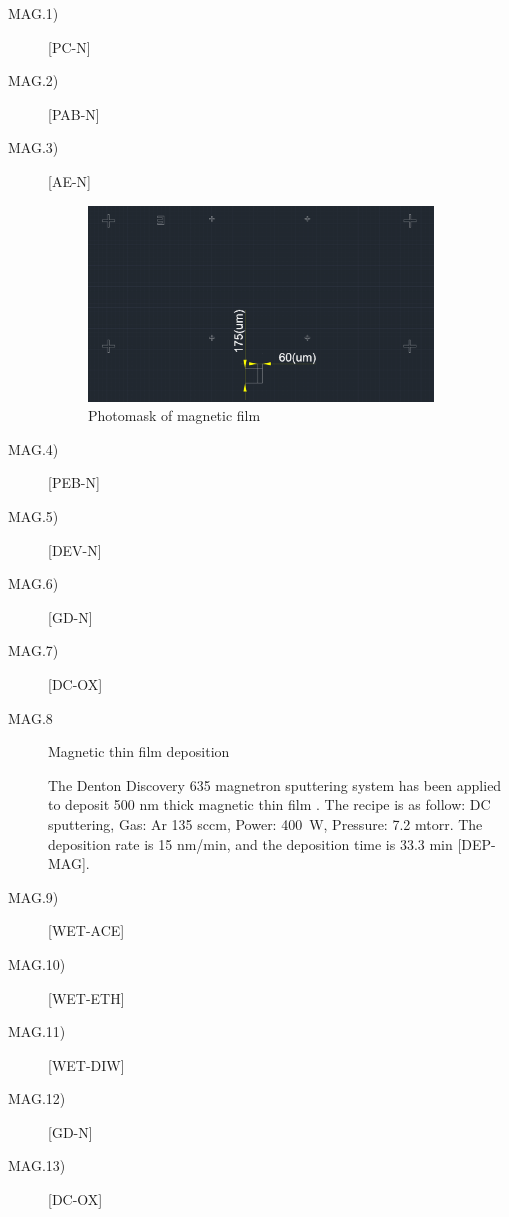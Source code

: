 \begin{description}
	\item[MAG.1)] [PC-N]
	\item[MAG.2)] [PAB-N]
	\item[MAG.3)] [AE-N]

\begin{figure}[H] 
\centering    
\includegraphics[width=0.9\textwidth]{magnetic film}
\caption[Photomask of magnetic film]{Photomask  of magnetic film}
\label{fig:magnetic film}
\end{figure}

	\item[MAG.4)] [PEB-N]
	
	\item[MAG.5)] [DEV-N]
	
	\item[MAG.6)] [GD-N]
	
	\item[MAG.7)] [DC-OX]
	
	\item[MAG.8] Magnetic thin film deposition
	
	The  Denton Discovery 635 magnetron sputtering  system has been applied to deposit 500 \unit{\nm} thick  magnetic thin film . The recipe is as follow: DC sputtering, Gas: Ar 135 sccm, Power: \SI{400}{\watt}, Pressure: 7.2 mtorr. The deposition rate is 15 \unit{nm/min}, and the deposition time is 33.3 min [DEP-MAG].
	
	\item[MAG.9)] [WET-ACE]
	
	\item[MAG.10)] [WET-ETH]
	
	\item[MAG.11)] [WET-DIW]
	
	\item[MAG.12)] [GD-N]
	
	\item[MAG.13)] [DC-OX]
	

\end{description}

